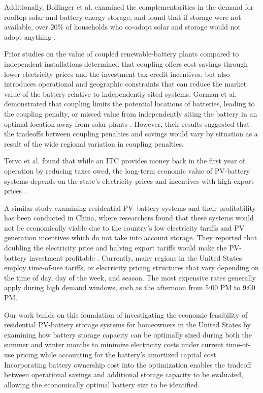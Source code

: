 \documentclass[14pt, final,numbered]{ifacconf}
\begin{document}
Additionally, Bollinger et al. examined the complementarities in the demand for rooftop solar and battery energy storage, and found that if storage were not available, over 20\% of households who co-adopt solar and storage would not adopt anything \cite{bollinger2023valuing}. 

Prior studies on the value of coupled renewable-battery plants compared to independent installations determined that coupling offers cost savings through lower electricity prices and the investment tax credit incentives, but also introduces operational and geographic constraints that can reduce the market value of the battery relative to independently sited systems. Gorman et al. demonstrated that coupling limits the potential locations of batteries, leading to the coupling penalty, or missed value from independently siting the battery in an optimal location away from solar plants \cite{gorman2022coupled}. However, their results suggested that the tradeoffs between coupling penalties and savings would vary by situation as a result of the wide regional variation in coupling penalties. 

Tervo et al. found that while an ITC provides money back in the first year of operation by reducing taxes owed, the long-term economic value of PV-battery systems depends on the state's electricity prices and incentives with high export prices \cite{tervo2018battery}.

A similar study examining residential PV–battery systems and their profitability has been conducted in China, where researchers found that these systems would not be economically viable due to the country's low electricity tariffs and PV generation incentives which do not take into account storage. They reported that doubling the electricity price and halving export tariffs would make the PV-battery investment profitable \cite{bagalini2019solar}. Currently, many regions in the United States employ time-of-use tariffs, or electricity pricing structures that vary depending on the time of day, day of the week, and season. The most expensive rates generally apply during high demand windows, such as the afternoon from 5:00 PM to 9:00 PM. 

Our work builds on this foundation of investigating the economic feasibility of residential PV-battery storage systems for homeowners in the United States by examining how battery storage capacity can be optimally sized during both the summer and winter months to minimize electricity costs under current time-of-use pricing while accounting for the battery's amortized capital cost. Incorporating battery ownership cost into the optimization enables the tradeoff between operational savings and additional storage capacity to be evaluated, allowing the economically optimal battery size to be identified.
\end{document}
